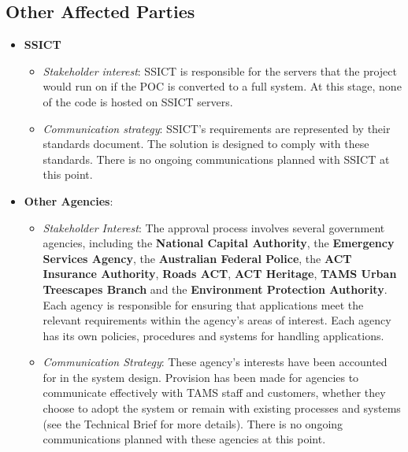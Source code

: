 \documentclass[12pt,a4paper,twosided]{article}
\begin{document}
\subsection{Other Affected Parties}\label{other-affected-parties}

\begin{itemize}
\itemsep1pt\parskip0pt
\item
  \textbf{SSICT}

  \begin{itemize}
  \itemsep1pt\parskip0pt
  \item
    \emph{Stakeholder interest}: SSICT is responsible for the servers
    that the project would run on if the POC is converted to a full
    system. At this stage, none of the code is hosted on SSICT servers.
  \item
    \emph{Communication strategy}: SSICT's requirements are represented
    by their standards document. The solution is designed to comply with
    these standards. There is no ongoing communications planned with
    SSICT at this point.
  \end{itemize}
\item
  \textbf{Other Agencies}:

  \begin{itemize}
  \itemsep1pt\parskip0pt
  \item
    \emph{Stakeholder Interest}: The approval process involves several
    government agencies, including the \textbf{National Capital
    Authority}, the \textbf{Emergency Services Agency}, the
    \textbf{Australian Federal Police}, the \textbf{ACT Insurance
    Authority}, \textbf{Roads ACT}, \textbf{ACT Heritage}, \textbf{TAMS
    Urban Treescapes Branch} and the \textbf{Environment Protection
    Authority}. Each agency is responsible for ensuring that
    applications meet the relevant requirements within the agency's
    areas of interest. Each agency has its own policies, procedures and
    systems for handling applications.
  \item
    \emph{Communication Strategy}: These agency's interests have been
    accounted for in the system design. Provision has been made for
    agencies to communicate effectively with TAMS staff and customers,
    whether they choose to adopt the system or remain with existing
    processes and systems (see the Technical Brief for more details).
    There is no ongoing communications planned with these agencies at
    this point.
  \end{itemize}
\end{itemize}
\end{document}
